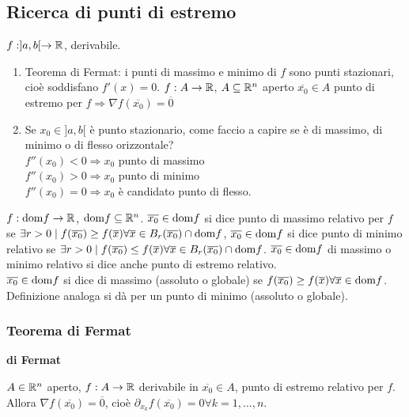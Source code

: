 \subsection{Ricerca di punti di estremo}

$f:]a,b[\rightarrow \mathbb{R}$, derivabile.
\begin{enumerate}
	\item Teorema di Fermat: i punti di massimo e minimo di $f$ sono punti stazionari, cioè soddisfano $f'(x)=0$.
	$f: A \rightarrow \mathbb{R}$, $A \subseteq \mathbb{R}^n$ aperto $\overline{x_0}\in A$ punto di estremo per $f \Rightarrow \nabla f(\overline{x_0})=\overline{0}$
	\item Se $x_0 \in ]a,b[$ è punto stazionario, come faccio a capire se è di massimo, di minimo o di flesso orizzontale?\\
	$f''(x_0)<0 \Rightarrow x_0$ punto di massimo\\
	$f''(x_0)>0 \Rightarrow x_0$ punto di minimo\\
	$f''(x_0)=0 \Rightarrow x_0$ è candidato punto di flesso.
\end{enumerate}


\begin{definition}
	$f:\mathrm{dom} f \rightarrow \mathbb{R}$, $\mathrm{dom} f \subseteq \mathbb{R}^n$. $\overline{x_0}\in \mathrm{dom} f$ si dice punto di massimo relativo per $f$ se $\exists r >0 \mid f(\overline{x_0})\geq f(\overline{x})\forall\overline{x}\in B_r(\overline{x_0})\cap \mathrm{dom} f$, $\overline{x_0}\in \mathrm{dom} f$ si dice punto di minimo relativo se $\exists r >0 \mid f(\overline{x_0})\leq f(\overline{x})\forall \overline{x} \in B_r(\overline{x_0})\cap \mathrm{dom} f$. $\overline{x_0} \in \mathrm{dom} f$ di massimo o minimo relativo si dice anche punto di estremo relativo.\\
	$\overline{x_0}\in \mathrm{dom} f$ si dice di massimo (assoluto o globale) se $f(\overline{x_0})\geq f(\overline{x})\forall \overline{x} \in \mathrm{dom} f$. Definizione analoga si dà per un punto di minimo (assoluto o globale).
\end{definition}


\subsubsection{Teorema di Fermat}
\begin{theorem} \textbf{di Fermat}
	
	\label{th: pag 366}
	$A \in \mathbb{R}^n$ aperto, $f: A \rightarrow \mathbb{R}$ derivabile in $\overline{x_0} \in A$, punto di estremo relativo per $f$. Allora $\nabla f(\overline{x_0})=\overline{0}$, cioè $\partial_{x_k}f(\overline{x_0})=0 \forall k =1,...,n$.
\end{theorem}


